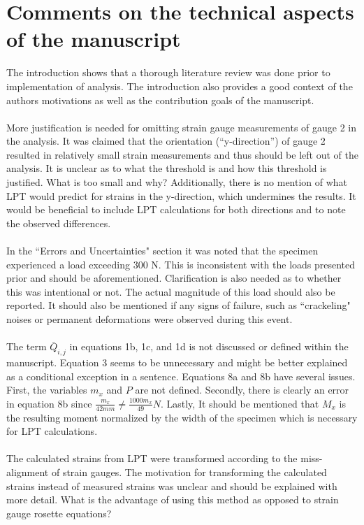 \documentclass[12pt]{article}
\begin{document}
\section*{Comments on the technical aspects of the manuscript}
The introduction shows that a thorough literature review was done prior to implementation of analysis. The introduction also provides a good context of the authors motivations as well as the contribution goals of the manuscript. 
 \\
 \\
More justification is needed for omitting strain gauge measurements of gauge 2 in the analysis.  It was claimed that the orientation (``y-direction'') of gauge 2  resulted in relatively small strain measurements and thus should be left out of the analysis. It is unclear as to what the threshold is and how this threshold is justified. What is too small and why? Additionally, there is no mention of what LPT would predict for strains in the y-direction, which undermines the results.  It would be beneficial to  include LPT calculations for both directions and to note the observed differences.
\\
\\
In the ``Errors and Uncertainties" section it was noted that the specimen experienced a load exceeding 300 N. This is inconsistent with the loads presented prior and should be aforementioned. Clarification is also needed as to whether this was intentional or not. The actual magnitude of this load should also be reported. It should also be mentioned if any signs of failure, such as ``crackeling" noises or permanent deformations were observed during this event.
\\
\\
The term $\bar Q_{i,j}$ in equations 1b, 1c, and 1d is not discussed or defined within the manuscript. Equation 3 seems to be unnecessary and might be better explained as a conditional exception in a sentence. Equations 8a and 8b have several issues. First, the variables $m_x$ and $P$ are not defined.  Secondly, there is clearly an error in equation 8b since $\frac{m_x}{42 mm} \neq \frac{1000m_x}{49}N$. Lastly, It should be mentioned that $M_x$ is the resulting moment normalized by the width of the specimen which is necessary for LPT calculations.
\\
\\
The calculated strains from LPT were transformed according to the miss-alignment of strain gauges. The motivation for transforming the calculated strains instead of measured strains was unclear and should be explained with more detail.  What is the advantage of using this method as opposed to strain gauge rosette equations?
\end{document}
